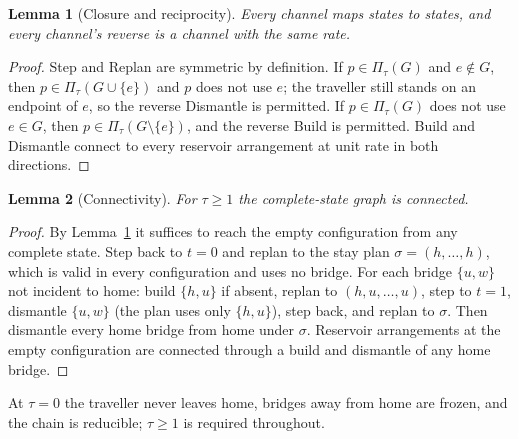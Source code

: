 \documentclass[aps,pre,preprint,superscriptaddress,nofootinbib]{revtex4-2}
\newtheorem{lemma}{Lemma}
\theoremstyle{definition}
\theoremstyle{remark}
\newcommand{\Pl}{\Pi_\tau}
\begin{document}
\begin{lemma}[Closure and reciprocity]
\label{lem:closure}
Every channel maps states to states, and every channel's reverse is a channel with the same rate.
\end{lemma}
\begin{proof}
Step and Replan are symmetric by definition. If $p\in\Pl(G)$ and $e\notin G$, then $p\in\Pl(G\cup\{e\})$ and $p$ does not use $e$; the traveller still stands on an endpoint of $e$, so the reverse Dismantle is permitted. If $p\in\Pl(G)$ does not use $e\in G$, then $p\in\Pl(G\setminus\{e\})$, and the reverse Build is permitted. Build and Dismantle connect to every reservoir arrangement at unit rate in both directions.
\end{proof}

\begin{lemma}[Connectivity]
\label{lem:connectivity}
For $\tau\ge1$ the complete-state graph is connected.
\end{lemma}
\begin{proof}
By Lemma~\ref{lem:closure} it suffices to reach the empty configuration from any complete state. Step back to $t=0$ and replan to the stay plan $\sigma=(h,\dots,h)$, which is valid in every configuration and uses no bridge. For each bridge $\{u,w\}$ not incident to home: build $\{h,u\}$ if absent, replan to $(h,u,\dots,u)$, step to $t=1$, dismantle $\{u,w\}$ (the plan uses only $\{h,u\}$), step back, and replan to $\sigma$. Then dismantle every home bridge from home under $\sigma$. Reservoir arrangements at the empty configuration are connected through a build and dismantle of any home bridge.
\end{proof}

At $\tau=0$ the traveller never leaves home, bridges away from home are frozen, and the chain is reducible; $\tau\ge1$ is required throughout.
\end{document}
